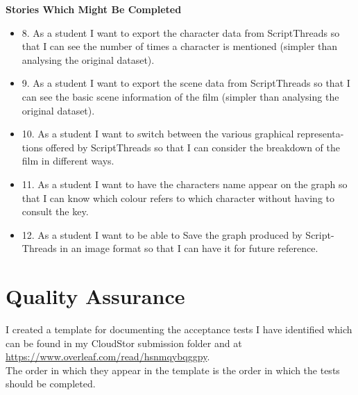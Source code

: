 \documentclass{article}
\begin{document}
\textbf{Stories Which Might Be Completed}
\begin{itemize}
    \item 8. As a student I want to export the character data from ScriptThreads so that I can see the number of times a character is mentioned (simpler than analysing the original dataset).
    \item 9. As a student I want to export the scene data from ScriptThreads so that I can see the basic scene information of the film (simpler than analysing the original dataset).
    \item 10. As a student I want to switch between the various graphical representa- tions offered by ScriptThreads so that I can consider the breakdown of the film in different ways.
    \item 11. As a student I want to have the characters name appear on the graph so that I can know which colour refers to which character without having to consult the key.
    \item 12. As a student I want to be able to Save the graph produced by Script- Threads in an image format so that I can have it for future reference.
\end{itemize}

\section{Quality Assurance}
I created a template for documenting the acceptance tests I have identified which can be found in my CloudStor submission folder and at \url{https://www.overleaf.com/read/hsnmqybqggpy}. \\
The order in which they appear in the template is the order in which the tests should be completed.
\end{document}
